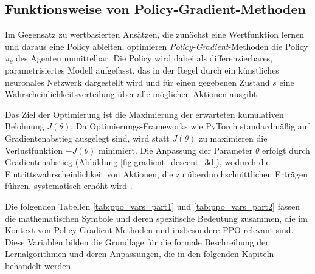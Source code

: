 \subsection{Funktionsweise von Policy\hyp{}Gradient\hyp{}Methoden}
Im Gegensatz zu wertbasierten Ansätzen, die zunächst eine Wertfunktion lernen und daraus eine Policy ableiten, optimieren \textit{Policy\hyp{}Gradient}\hyp{}Methoden die Policy $\pi_\theta$ des Agenten unmittelbar. 
Die Policy wird dabei als differenzierbares, parametrisiertes Modell aufgefasst, das in der Regel durch ein künstliches neuronales Netzwerk dargestellt wird und 
für einen gegebenen Zustand $s$ eine Wahrscheinlichkeitsverteilung über alle möglichen Aktionen ausgibt.
\medskip

Das Ziel der Optimierung ist die Maximierung der erwarteten kumulativen Belohnung $J(\theta)$. Da Optimierungs-Frameworks wie PyTorch standardmäßig auf Gradientenabstieg ausgelegt sind, wird statt $J(\theta)$ zu maximieren die Verlustfunktion $-J(\theta)$ minimiert.
Die Anpassung der Parameter $\theta$ erfolgt durch Gradientenabstieg (Abbildung \ref{fig:gradient_descent_3d}), wodurch die Eintrittswahrscheinlichkeit von Aktionen, die zu überdurchschnittlichen Erträgen 
führen, systematisch erhöht wird \cite[Kap. 13.2]{sutton2018rl}.
\medskip

Die folgenden Tabellen \ref{tab:ppo_vars_part1} und \ref{tab:ppo_vars_part2} fassen die mathematischen Symbole und deren spezifische Bedeutung zusammen, die im Kontext von Policy-Gradient-Methoden und insbesondere \ac{PPO} relevant sind. Diese Variablen bilden die Grundlage für die formale Beschreibung der Lernalgorithmen und deren Anpassungen, die in den folgenden Kapiteln behandelt werden.

